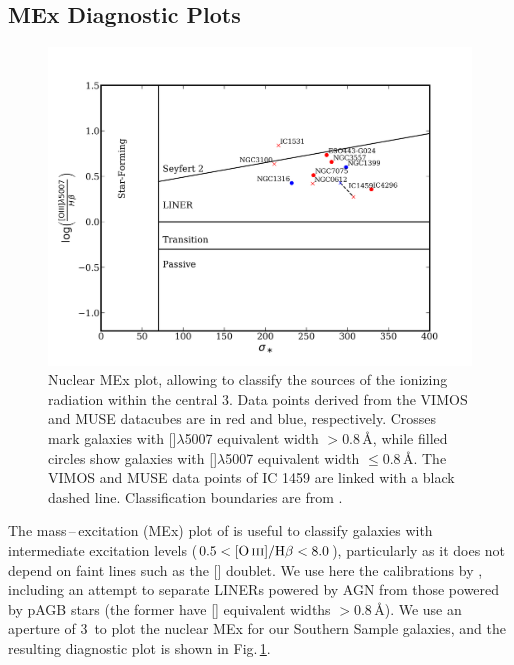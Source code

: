 	\subsection{MEx Diagnostic Plots}
		\label{subsec:MEx}
		\begin{figure}[t!]
			\centering
			\includegraphics[width=\textwidth]{chapter5/nuclear_MEx.png}
			\caption[Nuclear mass\,--\,excitation plot]{Nuclear MEx plot, allowing to classify the sources of the ionizing radiation within the central 3\arcsec. Data points derived from the VIMOS and MUSE datacubes are in red and blue, respectively. Crosses mark galaxies with []$\lambda$5007 equivalent width $> 0.8$\,\AA, while filled circles show galaxies with []$\lambda$5007 equivalent width $\leqslant 0.8$\,\AA. The VIMOS and MUSE data points of IC 1459 are linked with a black dashed line. Classification boundaries are from \citet{Nyland2016}.}
			\label{fig:MEx}
		\end{figure}

		The mass\,--\,excitation (MEx) plot of \citet{Juneau2011} is useful to classify galaxies with intermediate excitation levels ($0.5 < \mathrm{[\ion{O}{iii}]/H\beta} < 8.0$), particularly as it does not depend on faint lines such as the [] doublet. We use here the calibrations by \citet{Nyland2016}, including an attempt to separate LINERs powered by AGN from those powered by pAGB stars (the former have [] equivalent widths $>0.8$\,\AA). We use an aperture of 3\arcsec\ to plot the nuclear MEx for our Southern Sample galaxies, and the resulting diagnostic plot is shown in Fig.\,\ref{fig:MEx}. 


